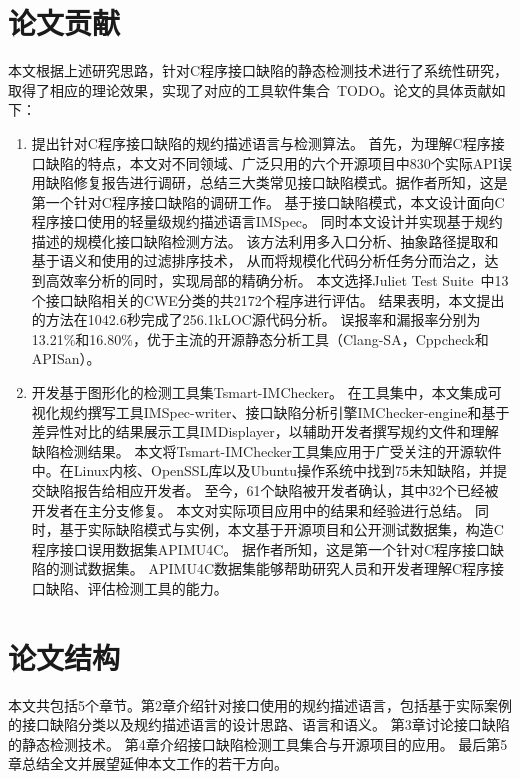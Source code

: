 \section{论文贡献}
本文根据上述研究思路，针对C程序接口缺陷的静态检测技术进行了系统性研究，取得了相应的理论效果，实现了对应的工具软件集合~\cite{19-icse-imchecker}TODO。论文的具体贡献如下：

\begin{enumerate}
	\item 提出针对C程序接口缺陷的规约描述语言与检测算法。
	首先，为理解C程序接口缺陷的特点，本文对不同领域、广泛只用的六个开源项目中830个实际API误用缺陷修复报告进行调研，总结三大类常见接口缺陷模式。据作者所知，这是第一个针对C程序接口缺陷的调研工作。
	基于接口缺陷模式，本文设计面向C程序接口使用的轻量级规约描述语言IMSpec。
	同时本文设计并实现基于规约描述的规模化接口缺陷检测方法。
	该方法利用多入口分析、抽象路径提取和基于语义和使用的过滤排序技术，
	从而将规模化代码分析任务分而治之，达到高效率分析的同时，实现局部的精确分析。
	本文选择Juliet Test Suite~\cite{juliet}中13个接口缺陷相关的CWE分类的共2172个程序进行评估。
	结果表明，本文提出的方法在1042.6秒完成了256.1kLOC源代码分析。
	误报率和漏报率分别为13.21\%和16.80\%，优于主流的开源静态分析工具（Clang-SA，Cppcheck和APISan）。
	
	\item 开发基于图形化的检测工具集Tsmart-IMChecker。
	在工具集中，本文集成可视化规约撰写工具IMSpec-writer、接口缺陷分析引擎IMChecker-engine和基于差异性对比的结果展示工具IMDisplayer，以辅助开发者撰写规约文件和理解缺陷检测结果。
	本文将Tsmart-IMChecker工具集应用于广受关注的开源软件中。在Linux内核、OpenSSL库以及Ubuntu操作系统中找到75未知缺陷，并提交缺陷报告给相应开发者。
	至今，61个缺陷被开发者确认，其中32个已经被开发者在主分支修复。
	本文对实际项目应用中的结果和经验进行总结。
	同时，基于实际缺陷模式与实例，本文基于开源项目和公开测试数据集，构造C程序接口误用数据集APIMU4C。
	据作者所知，这是第一个针对C程序接口缺陷的测试数据集。
	APIMU4C数据集能够帮助研究人员和开发者理解C程序接口缺陷、评估检测工具的能力。
	
	
\end{enumerate}
\section{论文结构}
本文共包括5个章节。第2章介绍针对接口使用的规约描述语言，包括基于实际案例的接口缺陷分类以及规约描述语言的设计思路、语言和语义。
第3章讨论接口缺陷的静态检测技术。
第4章介绍接口缺陷检测工具集合与开源项目的应用。
最后第5章总结全文并展望延伸本文工作的若干方向。
